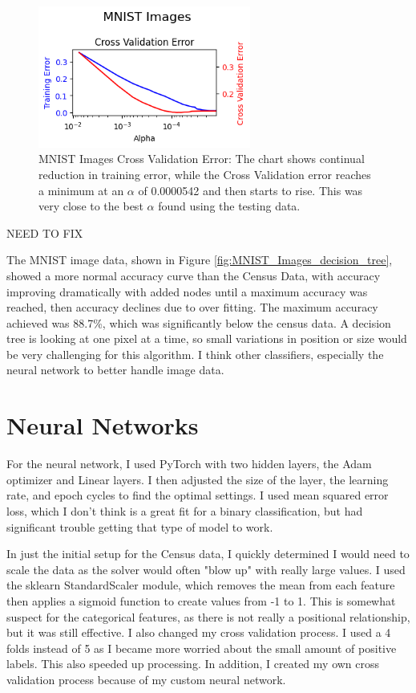 \documentclass[letterpaper]{article} %
\begin{document}
\begin{figure}[h]
\centering
\includegraphics[width=2.75in]{figures/MNIST_Images_decision_tree_cross_validation.png}
\caption{MNIST Images Cross Validation Error:  The chart shows continual reduction in training error, while the Cross Validation error reaches a minimum at an $\alpha$ of 0.0000542 and then starts to rise.  This was very close to the best $\alpha$ found using the testing data. }
\label{fig:MNIST_Images_decision_tree_cross_validation}
\end{figure}

NEED TO FIX

The MNIST image data, shown in Figure \ref{fig:MNIST_Images_decision_tree}, showed a more normal accuracy curve than the Census Data, with accuracy improving dramatically with added nodes until a maximum accuracy was reached, then accuracy declines due to over fitting.  The maximum accuracy achieved was 88.7\%, which was significantly below the census data.  A decision tree is looking at one pixel at a time, 
so small variations in position or size would be very challenging for this algorithm.  I think other classifiers, especially the neural network to better handle image data. 

\section{Neural Networks}
For the neural network, I used PyTorch with two hidden layers, the Adam optimizer and Linear layers.  I then adjusted the size of the layer, the learning rate, and epoch cycles to find the optimal settings.  I used mean squared error loss, which I don't think is a great fit for a binary classification, but had significant trouble getting that type of model to work.  

In just the initial setup for the Census data, I quickly determined I would need to scale the data as the solver would often "blow up" with really large values.  I used the sklearn StandardScaler module, which removes the mean from each feature then applies a sigmoid function to create values from -1 to 1.  This is somewhat suspect for the categorical features, as there is not really a positional relationship, but it was still effective.  I also changed my cross validation process.  I used a 4 folds instead of 5 as I became more worried about the small amount of positive labels.  This also speeded up processing.  In addition, I created my own cross validation process because of my custom neural network. 
\end{document}
